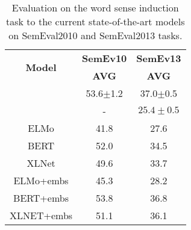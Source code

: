 \documentclass[11pt,a4paper]{article}
\begin{document}
\begin{table}[!h]
\footnotesize
\centering
\begin{tabular}{|c|c|c|}
\hline
\multicolumn{1}{|c|}{\multirow{2}{*}{\textbf{Model}}} & \textbf{SemEv10} & \textbf{SemEv13}  \\
                        & \textbf{AVG}       & \textbf{AVG}        \\
\hline
\cite{amrami-2019}      & 53.6$\pm$1.2     & 37.0$\pm$0.5      \\
\hline
\cite{amrami-2018}      & -         & $25.4 \pm 0.5$      \\
\hline
ELMo                        & 41.8      & 27.6       \\
\hline
BERT                        & 52.0      & 34.5       \\
\hline
XLNet                        & 49.6      & 33.7       \\
\hline
ELMo+embs                        & 45.3      & 28.2       \\
\hline
BERT+embs                        & 53.8      & 36.8       \\
\hline
XLNET+embs                        & 51.1      & 36.1    \\  
\hline
\end{tabular}
\caption{Evaluation on the word sense induction task to the current state-of-the-art models on SemEval2010 and SemEval2013 tasks. %
}
\label{tab:wsi-table}
\end{table}
\end{document}
